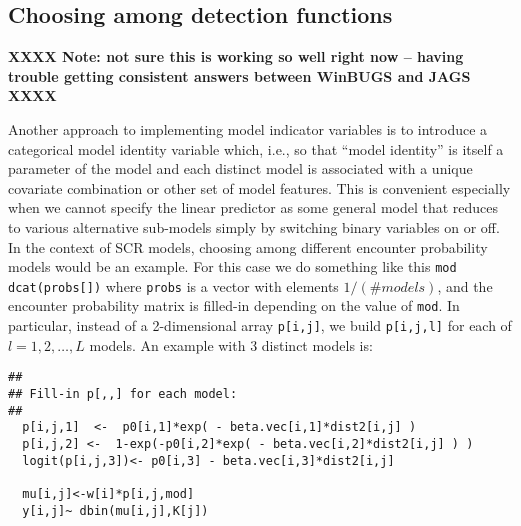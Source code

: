 \subsection{Choosing among detection functions}


{\bf XXXX Note: not sure this is working so well right now -- having
  trouble getting consistent answers between WinBUGS and JAGS XXXX}

Another approach to implementing model indicator variables is to
introduce a categorical model identity variable which, i.e., so that
``model identity'' is itself a parameter of the model and each
distinct model is associated with a unique covariate combination or
other set of model features. This is convenient especially when we
cannot specify the linear predictor as some general model that reduces
to various alternative sub-models simply by switching binary variables
on or off. In the context of SCR models, choosing among different
encounter probability models would be an example.  For this case we do
something like this \mbox{\tt mod ~  dcat(probs[])}
where \mbox{\tt probs} is a vector with elements $1/(\# models)$, and
the encounter probability matrix is filled-in depending on the value
 of \mbox{\tt mod}.
In particular, instead of a 2-dimensional array
 \mbox{\tt p[i,j]},  we build \mbox{\tt p[i,j,l]} for each of
$l=1,2,\ldots,L$ models. An example with 3 distinct models is:
{\small
\begin{verbatim}
##
## Fill-in p[,,] for each model:
##
  p[i,j,1]  <-  p0[i,1]*exp( - beta.vec[i,1]*dist2[i,j] )
  p[i,j,2] <-  1-exp(-p0[i,2]*exp( - beta.vec[i,2]*dist2[i,j] ) )
  logit(p[i,j,3])<- p0[i,3] - beta.vec[i,3]*dist2[i,j]

  mu[i,j]<-w[i]*p[i,j,mod]
  y[i,j]~ dbin(mu[i,j],K[j])
\end{verbatim}
}


